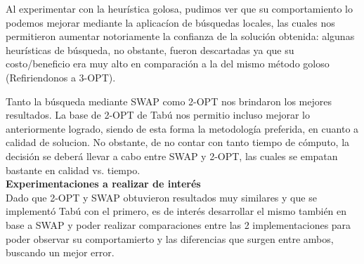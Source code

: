 Al experimentar con la heurística golosa, pudimos ver que su comportamiento lo podemos mejorar mediante la aplicacíon de búsquedas locales, las cuales nos permitieron aumentar notoriamente la confianza de la solución obtenida: algunas heurísticas de búsqueda, no obstante, fueron descartadas ya que  su costo/beneficio era muy alto en comparación a la del mismo método goloso (Refiriendonos a 3-OPT). 

Tanto la búsqueda mediante SWAP como 2-OPT nos brindaron los mejores resultados. La base de 2-OPT de Tabú nos permitio incluso mejorar lo anteriormente logrado, siendo de esta forma la metodología preferida, en cuanto a calidad de solucion. No obstante, de no contar con tanto tiempo de cómputo, la decisi\'on se deberá llevar a cabo entre SWAP y 2-OPT, las cuales se empatan bastante en calidad vs. tiempo.\\

\textbf{Experimentaciones a realizar de interés}\\
Dado que 2-OPT y SWAP obtuvieron resultados muy similares y que se implementó Tabú con el primero, es de interés desarrollar el mismo también en base a SWAP y poder realizar comparaciones entre las 2 implementaciones para poder observar su comportamierto y las diferencias que surgen entre ambos, buscando un mejor error.




